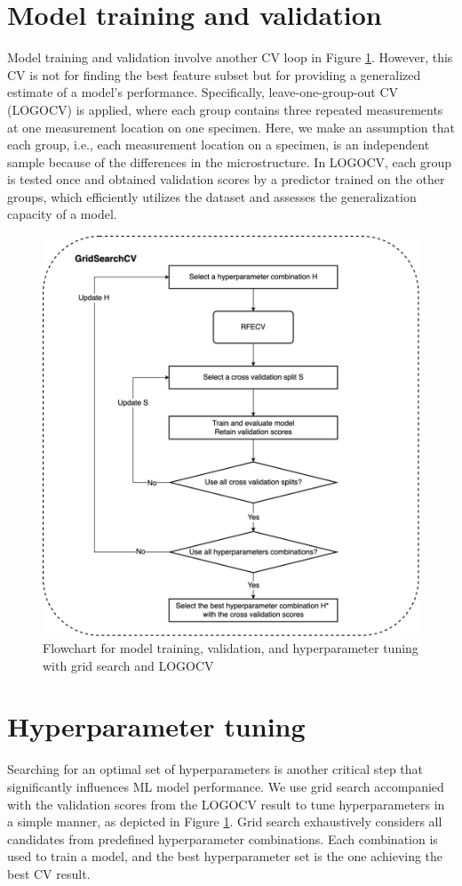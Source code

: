 \section{Model training and validation}
\label{sec: model train and val}
Model training and validation involve another CV loop in Figure \ref{fig: logocv}. However, this CV is not for finding the best feature subset but for providing a generalized estimate of a model's performance. Specifically, leave-one-group-out CV (LOGOCV) is applied, where each group contains three repeated measurements at one measurement location on one specimen. Here, we make an assumption that each group, i.e., each measurement location on a specimen, is an independent sample because of the differences in the microstructure. In LOGOCV, each group is tested once and obtained validation scores by a predictor trained on the other groups, which efficiently utilizes the dataset and assesses the generalization capacity of a model.

\begin{figure}[tb]
    \centering
    \includegraphics[width=0.9\linewidth]{fig/logocv.png}
    \caption{Flowchart for model training, validation, and hyperparameter tuning with grid search and LOGOCV}
    \label{fig: logocv}
\end{figure}

\section{Hyperparameter tuning}
Searching for an optimal set of hyperparameters is another critical step that significantly influences ML model performance. We use grid search accompanied with the validation scores from the LOGOCV result to tune hyperparameters in a simple manner, as depicted in Figure \ref{fig: logocv}. Grid search exhaustively considers all candidates from predefined hyperparameter combinations. Each combination is used to train a model, and the best hyperparameter set is the one achieving the best CV result. 

